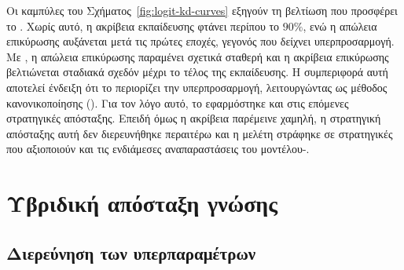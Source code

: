 Οι καμπύλες του Σχήματος~\ref{fig:logit-kd-curves} εξηγούν τη βελτίωση
που προσφέρει το . Χωρίς αυτό, η ακρίβεια εκπαίδευσης φτάνει περίπου το
\(90\%\), ενώ η απώλεια επικύρωσης αυξάνεται μετά τις πρώτες εποχές,
γεγονός που δείχνει υπερπροσαρμογή. Με , η απώλεια επικύρωσης παραμένει σχετικά σταθερή και η
ακρίβεια επικύρωσης βελτιώνεται σταδιακά σχεδόν μέχρι το τέλος της
εκπαίδευσης. Η συμπεριφορά αυτή αποτελεί ένδειξη ότι το 
περιορίζει την υπερπροσαρμογή, λειτουργώντας ως μέθοδος
κανονικοποίησης (). Για τον λόγο αυτό, το  εφαρμόστηκε και στις επόμενες
στρατηγικές απόσταξης. Επειδή όμως η ακρίβεια παρέμεινε χαμηλή, η
στρατηγική απόσταξης αυτή δεν διερευνήθηκε περαιτέρω και η μελέτη στράφηκε σε
στρατηγικές που αξιοποιούν και τις ενδιάμεσες αναπαραστάσεις του
μοντέλου-.

\section{Υβριδική απόσταξη γνώσης}
\label{sec:hybrid-kd-results}

\subsection{Διερεύνηση των υπερπαραμέτρων}
\label{subsec:hybrid-kd-hyperparameters}

